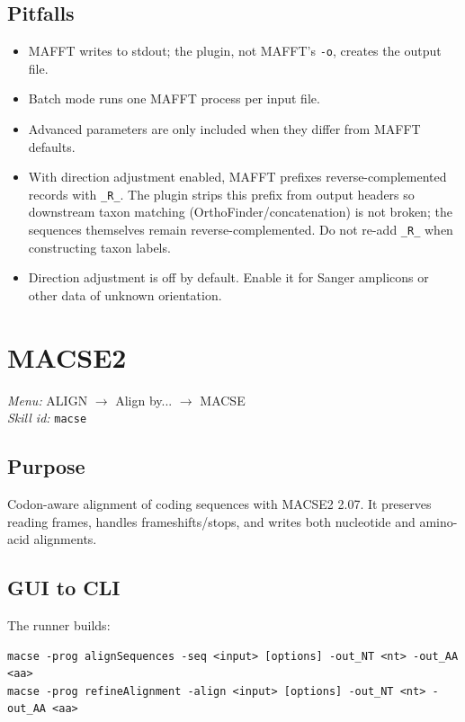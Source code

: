 \documentclass[11pt]{report}
\begin{document}
\subsection{Pitfalls}

\begin{itemize}
  \item MAFFT writes to stdout; the plugin, not MAFFT's \texttt{-o}, creates the output file.
  \item Batch mode runs one MAFFT process per input file.
  \item Advanced parameters are only included when they differ from MAFFT defaults.
  \item With direction adjustment enabled, MAFFT prefixes reverse-complemented records with \texttt{\_\allowbreak R\_\allowbreak }. The plugin strips this prefix from output headers so downstream taxon matching (OrthoFinder/concatenation) is not broken; the sequences themselves remain reverse-complemented. Do not re-add \texttt{\_\allowbreak R\_\allowbreak } when constructing taxon labels.
  \item Direction adjustment is off by default. Enable it for Sanger amplicons or other data of unknown orientation.
\end{itemize}


\section{MACSE2}
\noindent\textit{Menu:} ALIGN $\rightarrow$ Align by... $\rightarrow$ MACSE\\
\noindent\textit{Skill id:} \texttt{macse}

\subsection{Purpose}

Codon-aware alignment of coding sequences with MACSE2 2.07. It preserves reading frames, handles frameshifts/stops, and writes both nucleotide and amino-acid alignments.

\subsection{GUI to CLI}

The runner builds:

\begin{lstlisting}
macse -prog alignSequences -seq <input> [options] -out_NT <nt> -out_AA <aa>
macse -prog refineAlignment -align <input> [options] -out_NT <nt> -out_AA <aa>
\end{lstlisting}
\end{document}

